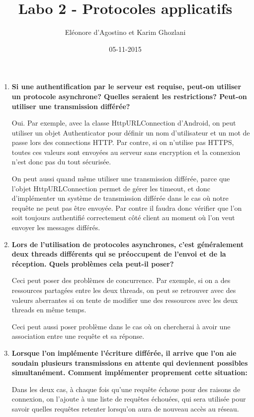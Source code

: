 \documentclass{article}
\title{Labo 2 - Protocoles applicatifs}
\date{05-11-2015}
\author{Eléonore d'Agostino et Karim Ghozlani}
\begin{document}
  \maketitle
  \newpage

  \begin{enumerate}
    \item \textbf{Si une authentification par le serveur est requise, peut-on utiliser un protocole asynchrone? Quelles seraient les restrictions? Peut-on utiliser une transmission différée?}

      Oui. Par exemple, avec la classe HttpURLConnection d'Android, on peut utiliser un objet Authenticator pour définir un nom d'utilisateur et un mot de passe lors des connections HTTP. Par contre, si on n'utilise pas HTTPS, toutes ces valeurs sont envoyées au serveur sans encryption et la connexion n'est donc pas du tout sécurisée.
	  
	  On peut aussi quand même utiliser une transmission différée, parce que l'objet HttpURLConnection permet de gérer les timeout, et donc d'implémenter un système de transmission différée dans le cas où notre requête ne peut pas être envoyée. Par contre il faudra donc vérifier que l'on soit toujours authentifié correctement côté client au moment où l'on veut envoyer les messages différés.

    \item \textbf{Lors de l'utilisation de protocoles asynchrones, c'est généralement deux threads différents qui se préoccupent de l'envoi et de la réception. Quels problèmes cela peut-il poser?}
      
      Ceci peut poser des problèmes de concurrence. Par exemple, si on a des ressources partagées entre les deux threads, on peut se retrouver avec des valeurs aberrantes si on tente de modifier une des ressources avec les deux threads en même temps.
	  
	  Ceci peut aussi poser problème dans le cas où on chercherai à avoir une association entre une requête et sa réponse.

    \item \textbf{Lorsque l'on implémente l'écriture différée, il arrive que l'on aie soudain plusieurs transmissions en attente qui deviennent possibles simultanément. Comment implémenter proprement cette situation:}
	
	  Dans les deux cas, à chaque fois qu'une requête échoue pour des raisons de connexion, on l'ajoute à une liste de requêtes échouées, qui sera utilisée pour savoir quelles requêtes retenter lorsqu'on aura de nouveau accès au réseau.
      

\end{enumerate}
\end{document}
